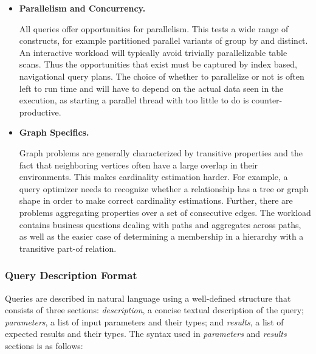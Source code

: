 \begin{itemize}
    \item \textbf{Parallelism and Concurrency.}

All queries offer opportunities for parallelism.  This tests a wide
range of constructs, for example partitioned parallel variants of
group by and distinct.  An interactive workload will typically avoid
trivially parallelizable table scans.  Thus the opportunities that
exist must be captured by index based, navigational query plans.  The
choice of whether to parallelize or not is often left to run time and
will have to depend on the actual data seen in the execution, as
starting a parallel thread with too little to do is
counter-productive.


    \item \textbf{Graph Specifics.}

Graph problems are generally characterized by transitive properties
and the fact that neighboring vertices often have a large overlap in
their environments.  This makes cardinality estimation harder.  For
example, a query optimizer needs to recognize whether a relationship
has a tree or graph shape in order to make correct cardinality
estimations.  Further, there are problems aggregating properties over
a set of consecutive edges.  The workload contains business questions
dealing with paths and aggregates across paths, as well as the easier
case of determining a membership in a hierarchy with a transitive
part-of relation.
\end{itemize}


\subsubsection{Query Description Format}
\label{sub:queries_structure}
Queries are described in natural language using a well-defined structure that consists of three sections:
\textit{description}, a concise textual description of the query; 
\textit{parameters}, a list of input parameters and their types;
and \textit{results}, a list of expected results and their types.
The syntax used in \textit{parameters} and \textit{results} sections is as follows:

